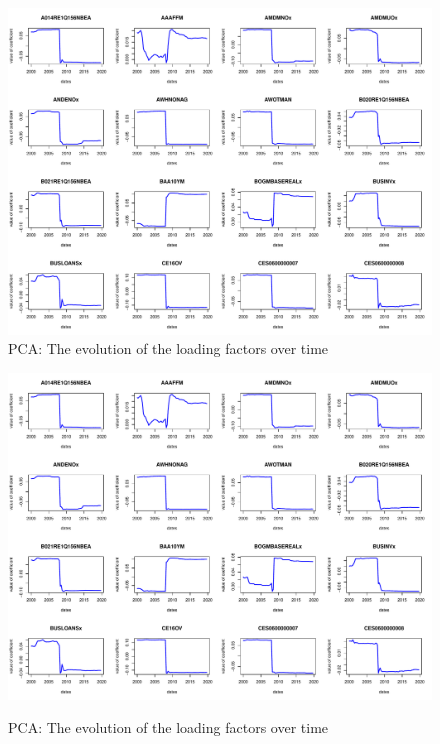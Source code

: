 \documentclass{article}
\begin{document}
\begin{subfigures}
\begin{figure}[hbt!]
\includegraphics[page = 3, width=\textwidth]{plots/pca_loads}
\caption{\label{third}PCA: The evolution of the loading factors over time}
\label{fig:pca_loads}
\centering
\end{figure}

\begin{figure}[hbt!]
\includegraphics[page = 4, width=\textwidth]{plots/pca_loads}
\label{fig:pca_loads}
\caption{\label{fourth}PCA: The evolution of the loading factors over time}
\centering
\end{figure}


\end{subfigures}
\end{document}
